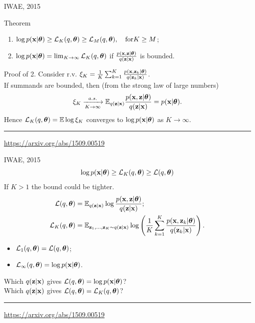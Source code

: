 \begin{frame}{IWAE, 2015}
\begin{block}{Theorem}
	\begin{enumerate}
		\item $\log p(\mathbf{x} | \boldsymbol{\theta}) \geq \mathcal{L}_K (q, \boldsymbol{\theta}) \geq \mathcal{L}_M (q, \boldsymbol{\theta}), \quad \text{for} K \geq M$;
		\item $\log p(\mathbf{x} | \boldsymbol{\theta}) = \lim_{K \rightarrow \infty} \mathcal{L}_K (q, \boldsymbol{\theta})$ if $\frac{p(\mathbf{x}, \mathbf{z} | \boldsymbol{\theta})}{q(\mathbf{z} | \mathbf{x})}$ is bounded.
	\end{enumerate}
	\vspace{-0.2cm}
\end{block}
\begin{block}{Proof of 2.}
	\vspace{0.2cm}
	Consider r.v. $\xi_K = \frac{1}{K}\sum_{k=1}^K \frac{p(\mathbf{x}, \mathbf{z}_k | \boldsymbol{\theta})}{q(\mathbf{z}_k | \mathbf{x})}$. \\
	\vspace{0.2cm}
	If summands are bounded, then (from the strong law of large numbers)
	\[
	\xi_K \xrightarrow[K \rightarrow \infty]{a.s.} \mathbb{E}_{q(\mathbf{z} | \mathbf{x})} \frac{p(\mathbf{x}, \mathbf{z} | \boldsymbol{\theta})}{q(\mathbf{z} | \mathbf{x})} = p(\mathbf{x} | \boldsymbol{\theta}).
	\]
	Hence $\mathcal{L}_K (q, \boldsymbol{\theta}) = \mathbb{E} \log \xi_K$ converges to $\log p(\mathbf{x} | \boldsymbol{\theta})$ as $K \rightarrow \infty$.
\end{block}
\vfill
\hrule\medskip
{\scriptsize \href{https://arxiv.org/abs/1509.00519}{https://arxiv.org/abs/1509.00519}}
\end{frame}
\begin{frame}{IWAE, 2015}
\[
\log p(\mathbf{x} | \boldsymbol{\theta}) \geq \mathcal{L}_K(q, \boldsymbol{\theta}) \geq \mathcal{L}(q, \boldsymbol{\theta})
\]
If $K > 1$ the bound could be tighter.
\begin{align*}
	\mathcal{L} (q, \boldsymbol{\theta}) &= \mathbb{E}_{q(\mathbf{z} | \mathbf{x})} \log \frac{p(\mathbf{x}, \mathbf{z} | \boldsymbol{\theta})}{q(\mathbf{z}| \mathbf{x})}; \\
	\mathcal{L}_K (q, \boldsymbol{\theta}) &= \mathbb{E}_{\mathbf{z}_1, \dots, \mathbf{z}_K \sim q(\mathbf{z} | \mathbf{x})} \log \left( \frac{1}{K}\sum_{k=1}^K\frac{p(\mathbf{x}, \mathbf{z}_k | \boldsymbol{\theta})}{q(\mathbf{z}_k| \mathbf{x})} \right).
\end{align*}
\vspace{-0.2cm}
\begin{itemize}
	\item $\mathcal{L}_1(q, \boldsymbol{\theta}) = \mathcal{L}(q, \boldsymbol{\theta})$;
	\item $\mathcal{L}_{\infty}(q, \boldsymbol{\theta}) = \log p(\mathbf{x} | \boldsymbol{\theta})$.
\end{itemize}
\vspace{0.2cm}
Which $q(\mathbf{z} | \mathbf{x})$ gives $\mathcal{L}(q, \boldsymbol{\theta}) = \log p(\mathbf{x} | \boldsymbol{\theta})$? \\
\vspace{0.2cm}
Which $q(\mathbf{z} | \mathbf{x})$ gives $\mathcal{L}(q, \boldsymbol{\theta}) = \mathcal{L}_K(q, \boldsymbol{\theta})$?
\vfill
\hrule\medskip
{\scriptsize \href{https://arxiv.org/abs/1509.00519}{https://arxiv.org/abs/1509.00519}}
\end{frame}
